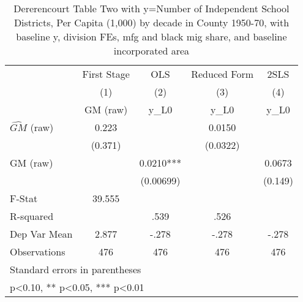 \begin{table}[htbp]\centering
\def\sym#1{\ifmmode^{#1}\else\(^{#1}\)\fi}
\caption{Dererencourt Table Two with y=Number of Independent School Districts, Per Capita (1,000) by decade in County 1950-70, with baseline y, division FEs, mfg and black mig share, and baseline incorporated area}
\begin{tabular}{l*{4}{c}}
\toprule
                    & First Stage   &         OLS   &Reduced Form   &        2SLS   \\
                    &\multicolumn{1}{c}{(1)}&\multicolumn{1}{c}{(2)}&\multicolumn{1}{c}{(3)}&\multicolumn{1}{c}{(4)}\\
                    &\multicolumn{1}{c}{GM  (raw)}&\multicolumn{1}{c}{y\_L0}&\multicolumn{1}{c}{y\_L0}&\multicolumn{1}{c}{y\_L0}\\
\midrule
$\hat{GM}$ (raw)    &       0.223   &               &      0.0150   &               \\
                    &     (0.371)   &               &    (0.0322)   &               \\
\addlinespace
GM  (raw)           &               &      0.0210***&               &      0.0673   \\
                    &               &   (0.00699)   &               &     (0.149)   \\
\midrule
F-Stat              &      39.555   &               &               &               \\
R-squared           &               &        .539   &        .526   &               \\
Dep Var Mean        &       2.877   &       -.278   &       -.278   &       -.278   \\
Observations        &         476   &         476   &         476   &         476   \\
\bottomrule
\multicolumn{5}{l}{\footnotesize Standard errors in parentheses}\\
\multicolumn{5}{l}{\footnotesize * p<0.10, ** p<0.05, *** p<0.01}\\
\end{tabular}
\end{table}
